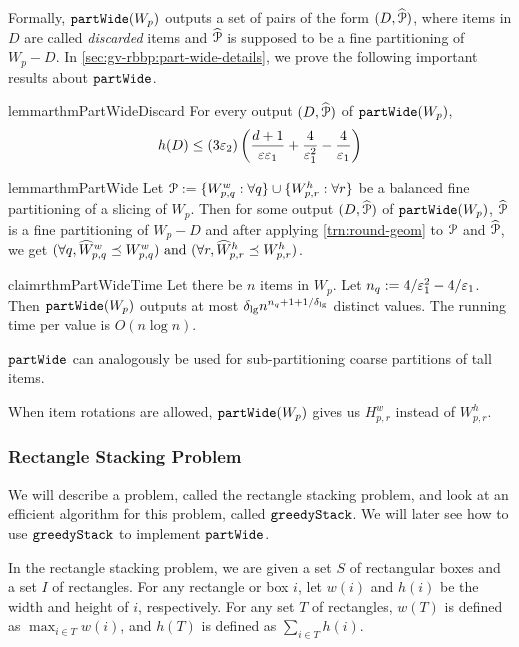 Formally, $\operatorname{\mathtt{partWide}}(W_p)$ outputs a set of pairs of the form $(D, \widehat{\mathcal{P}})$,
where items in $D$ are called \emph{discarded} items and $\widehat{\mathcal{P}}$ is supposed to be
a fine partitioning of $W_p - D$.
In \cref{sec:gv-rbbp:part-wide-details}, we prove the following important
results about $\operatorname{\mathtt{partWide}}$.

\begin{restatable}{lemma}{rthmPartWideDiscard}
\label{lem:part-wide-discard}
For every output $(D, \widehat{\mathcal{P}})$ of $\operatorname{\mathtt{partWide}}(W_p)$,
\[ h(D) \le (3\varepsilon_2)\left( \frac{d+1}{\varepsilon\varepsilon_1} + \frac{4}{\varepsilon_1^2}
    - \frac{4}{\varepsilon_1} \right) \]
\end{restatable}

\begin{restatable}{lemma}{rthmPartWide}
\label{lem:part-wide}
Let $\mathcal{P} := \{W_{p,q}^w: \forall q\} \cup \{W_{p,r}^h: \forall r\}$ be
a balanced fine partitioning of a slicing of $W_p$.
Then for some output $(D, \widehat{\mathcal{P}})$ of $\operatorname{\mathtt{partWide}}(W_p)$,
$\widehat{\mathcal{P}}$ is a fine partitioning of $W_p - D$
and after applying \cref{trn:round-geom} to $\mathcal{P}$ and $\widehat{\mathcal{P}}$, we get
$(\forall q, \widehat{W}^w_{p,q} \preceq W^w_{p,q})
\textrm{ and } (\forall r, \widehat{W}^h_{p,r} \preceq W^h_{p,r})$.
\end{restatable}

\begin{restatable}{claim}{rthmPartWideTime}
\label{claim:part-wide-time}
Let there be $n$ items in $W_p$. Let $n_q := 4/\varepsilon_1^2 - 4/\varepsilon_1$.
Then $\operatorname{\mathtt{partWide}}(W_p)$ outputs at most $\delta_{\mathrm{lg}} n^{n_q + 1 + 1/\delta_{\mathrm{lg}}}$
distinct values. The running time per value is $O(n\log n)$.
\end{restatable}

$\operatorname{\mathtt{partWide}}$ can analogously be used for sub-partitioning coarse partitions of tall items.

When item rotations are allowed, $\operatorname{\mathtt{partWide}}(W_p)$ gives us $H^w_{p,r}$ instead of $W^h_{p,r}$.

\subsubsection{Rectangle Stacking Problem}
\label{sec:gv-rbbp:greedy-stack}

We will describe a problem, called the rectangle stacking problem,
and look at an efficient algorithm for this problem, called $\operatorname{\mathtt{greedyStack}}$.
We will later see how to use $\operatorname{\mathtt{greedyStack}}$ to implement $\operatorname{\mathtt{partWide}}$.

In the rectangle stacking problem, we are given a set $S$ of rectangular boxes
and a set $I$ of rectangles.
For any rectangle or box $i$, let $w(i)$ and $h(i)$ be the width and height of $i$, respectively.
For any set $T$ of rectangles, $w(T)$ is defined as $\max_{i \in T} w(i)$,
and $h(T)$ is defined as $\sum_{i \in T} h(i)$.

